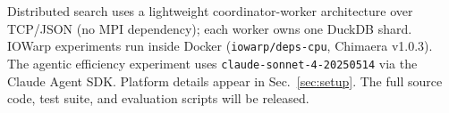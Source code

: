 Distributed search uses a lightweight coordinator-worker architecture over TCP/JSON (no MPI dependency); each worker owns one DuckDB shard. IOWarp experiments run inside Docker (\texttt{iowarp/deps-cpu}, Chimaera v1.0.3). The agentic efficiency experiment uses \texttt{claude-sonnet-4-20250514} via the Claude Agent SDK. Platform details appear in Sec.~\ref{sec:setup}. The full source code, test suite, and evaluation scripts will be released.

